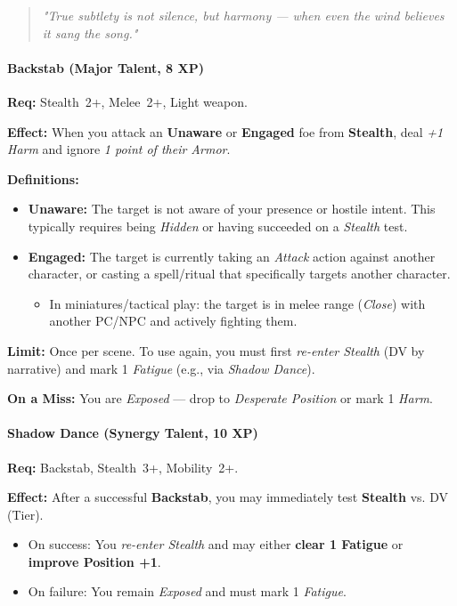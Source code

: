\begin{quote}
\emph{"True subtlety is not silence, but harmony --- when even the wind believes it sang the song."}
\end{quote}


\paragraph{Backstab (Major Talent, 8 XP)} 
\textbf{Req:} Stealth~2+, Melee~2+, Light weapon.  

\textbf{Effect:} When you attack an \textbf{Unaware} or \textbf{Engaged} foe from \textbf{Stealth}, deal \emph{+1 Harm} and ignore \emph{1 point of their Armor}.  

\textbf{Definitions:}  
\begin{itemize}
  \item \textbf{Unaware:} The target is not aware of your presence or hostile intent. This typically requires being \emph{Hidden} or having succeeded on a \emph{Stealth} test.  
  \item \textbf{Engaged:} The target is currently taking an \emph{Attack} action against another character, or casting a spell/ritual that specifically targets another character.  
  \begin{itemize}
    \item In miniatures/tactical play: the target is in melee range (\emph{Close}) with another PC/NPC and actively fighting them.  
  \end{itemize}
\end{itemize}

\textbf{Limit:} Once per scene. To use again, you must first \emph{re-enter Stealth} (DV by narrative) and mark 1 \emph{Fatigue} (e.g., via \emph{Shadow Dance}).  

\textbf{On a Miss:} You are \emph{Exposed} --- drop to \emph{Desperate Position} or mark 1 \emph{Harm}.    

\paragraph{Shadow Dance (Synergy Talent, 10 XP)}  
\textbf{Req:} Backstab, Stealth~3+, Mobility~2+.  

\textbf{Effect:} After a successful \textbf{Backstab}, you may immediately test \textbf{Stealth} vs. DV (Tier).  
\begin{itemize}
  \item On success: You \emph{re-enter Stealth} and may either \textbf{clear 1 Fatigue} or \textbf{improve Position +1}.  
  \item On failure: You remain \emph{Exposed} and must mark 1 \emph{Fatigue}.  
\end{itemize}  

